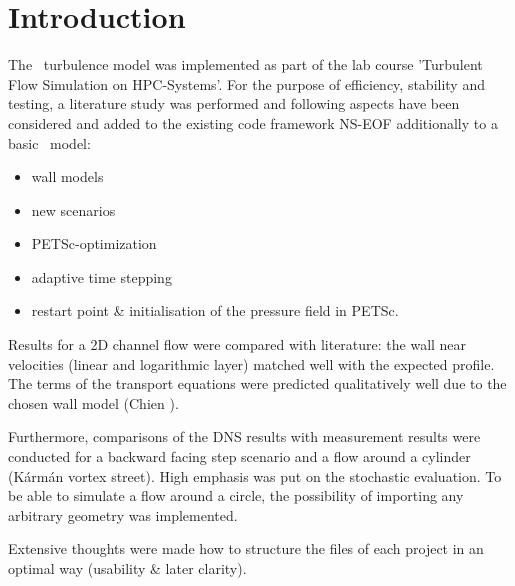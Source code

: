 \chapter{Introduction} %
\label{cha:introduction}



The \ke\, turbulence model was implemented as part of the lab course 'Turbulent Flow Simulation on HPC-Systems'. For the purpose of efficiency, stability and testing, a literature study was performed and following aspects have been considered and added to the existing code framework NS-EOF additionally to a basic \ke\, model:

\begin{itemize}
\item wall models
\item new scenarios
\item PETSc-optimization
\item adaptive time stepping
\item restart point \& initialisation of the pressure field in PETSc.
\end{itemize}

\noi Results for a 2D channel flow were compared with literature: the wall near velocities (linear and logarithmic layer) matched well with the expected profile. The terms of the transport equations were predicted qualitatively well due to the chosen wall model (Chien \citep{fan1993}).

\noii Furthermore, comparisons of the DNS results with measurement results were conducted for a backward facing step scenario and a flow around a cylinder (K\'arm\'an vortex street).
High emphasis was put on the stochastic evaluation. To be able to simulate a flow around a circle, the possibility of importing any arbitrary geometry was implemented.

\noii Extensive thoughts were made how to structure the files of each project in an optimal way (usability \& later clarity).

